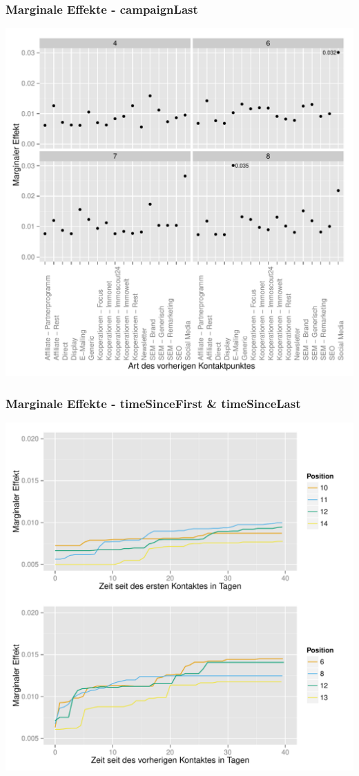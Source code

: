 \begin{frame}\frametitle{Marginale Effekte - campaignLast}
	\centering\includegraphics[scale=0.3]{marg_eff_campaignLast.pdf}
\end{frame}

\begin{frame}\frametitle{Marginale Effekte - timeSinceFirst \& timeSinceLast}
	\centering\includegraphics[scale=0.3]{marg_eff_time.pdf}
\end{frame}

